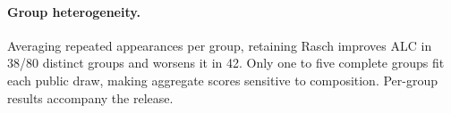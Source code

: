 \paragraph{Group heterogeneity.} Averaging repeated appearances per group, retaining Rasch improves ALC in 38/80 distinct groups and worsens it in 42. Only one to five complete groups fit each public draw, making aggregate scores sensitive to composition. Per-group results accompany the release.
